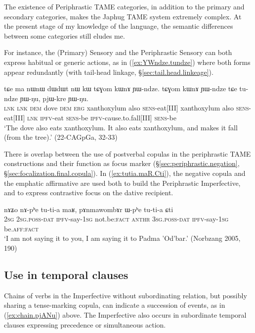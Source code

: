 The existence of Periphrastic TAME categories, in addition to the primary and secondary categories, makes the Japhug TAME system extremely complex. At the present stage of my knowledge of the language, the semantic differences between some categories still eludes me.

For instance, the (Primary) Sensory and the Periphrastic Sensory can both express habitual or generic actions, as in (\ref{ex:YWndze.tundze}) where both forms appear redundantly (with tail-head linkage, §\ref{sec:tail.head.linkeage}).

\begin{exe}
\ex \label{ex:YWndze.tundze}
\gll tɕe ma nɯnɯ dɯdɯt nɯ kɯ tɕɣom kɯnɤ ɲɯ-ndze. tɕɣom kɯnɤ ɲɯ-ndze tɕe tu-ndze ɲɯ-ŋu, pjɯ-kre ɲɯ-ŋu. \\
\textsc{lnk} \textsc{lnk} \textsc{dem} dove \textsc{dem} \textsc{erg} xanthoxylum also \textsc{sens}-eat[III]  xanthoxylum also \textsc{sens}-eat[III] \textsc{lnk} \textsc{ipfv}-eat \textsc{sens}-be \textsc{ipfv}-cause.to.fall[III] \textsc{sens}-be \\
\glt `The dove also eats xanthoxylum. It also eats xanthoxylum, and makes it fall (from the tree).' (22-CAGpGa, 32-33)
\end{exe}

There is overlap between the use of postverbal copulas in the periphrastic TAME constructions and their function as focus marker (§\ref{sec:periphrastic.negation}, §\ref{sec:focalization.final.copula}). In (\ref{ex:tutia.maR.Cti}), the negative copula  and the emphatic affirmative  are used both to build the Periphrastic Imperfective, and to express contrastive focus on the dative recipient.


\begin{exe}
\ex \label{ex:tutia.maR.Cti}
\gll nɤʑo nɤ-pʰe tu-ti-a maʁ, pɤnmawombɤr ɯ-pʰe tu-ti-a ɕti \\
\textsc{2sg} \textsc{2sg}.\textsc{poss}-\textsc{dat} \textsc{ipfv}-say-\textsc{1sg} not.be:\textsc{fact}  \textsc{anthr} \textsc{3sg}.\textsc{poss}-\textsc{dat}  \textsc{ipfv}-say-\textsc{1sg} be.\textsc{aff}:\textsc{fact} \\
\glt `I am not saying it to you, I am saying it to Padma 'Od'bar.' (Norbzang 2005, 190)
\end{exe}

\subsection{Use in temporal clauses} \label{sec:ipfv.temporal}
Chains of verbs in the Imperfective without subordinating relation, but possibly sharing a tense-marking copula, can indicate a succession of events, as in (\ref{ex:chain.pjANu}) above. The Imperfective also occurs in subordinate temporal clauses expressing precedence or simultaneous action.

